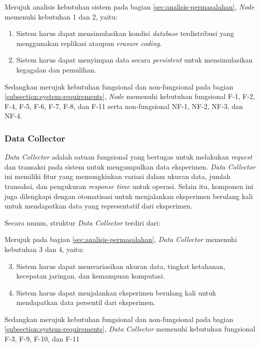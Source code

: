 Merujuk analisis kebutuhan sistem pada bagian \ref{sec:analisis-permasalahan}, \textit{Node} memenuhi kebutuhan 1 dan 2, yaitu:

\begin{enumerate}
    \item Sistem harus dapat mensimulasikan kondisi \textit{database} terdistribusi yang menggunakan replikasi ataupun \textit{erasure coding}.
    \item Sistem harus dapat menyimpan data secara \textit{persistent} untuk mensimulasikan kegagalan dan pemulihan.
\end{enumerate}

Sedangkan merujuk kebutuhan fungsional dan non-fungsional pada bagian \ref{subsection:system-requirements}, \textit{Node} memenuhi kebutuhan fungsional F-1, F-2, F-4, F-5, F-6, F-7, F-8, dan F-11 serta non-fungsional NF-1, NF-2, NF-3, dan NF-4.

\subsubsection{Data Collector}
\label{subsubsection:data-collector}

\textit{Data Collector} adalah satuan fungsional yang bertugas untuk melakukan \textit{request} dan transaksi pada sistem untuk mengumpulkan data eksperimen. \textit{Data Collector} ini memiliki fitur yang memungkinkan variasi dalam ukuran data, jumlah transaksi, dan pengukuran \textit{response time} untuk operasi. Selain itu, komponen ini juga dilengkapi dengan otomatisasi untuk menjalankan eksperimen berulang kali untuk mendapatkan data yang representatif dari eksperimen.

Secara umum, struktur \textit{Data Collector} terdiri dari:


Merujuk pada bagian \ref{sec:analisis-permasalahan}, \textit{Data Collector} memenuhi kebutuhan 3 dan 4, yaitu:

\begin{enumerate}
    \setcounter{enumi}{2}
    \item Sistem harus dapat memvariasikan ukuran data, tingkat ketahanan, kecepatan jaringan, dan kemampuan komputasi.
    \item Sistem harus dapat menjalankan eksperimen berulang kali untuk mendapatkan data persentil dari eksperimen.
\end{enumerate}

Sedangkan merujuk kebutuhan fungsional dan non-fungsional pada bagian \ref{subsection:system-requirements}, \textit{Data Collector} memenuhi kebutuhan fungsional F-3, F-9, F-10, dan F-11
